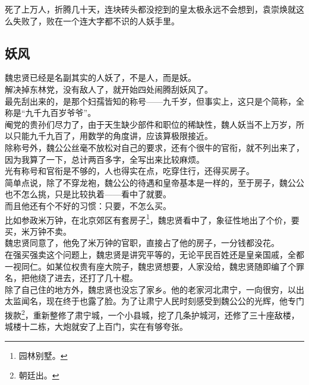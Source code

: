 \begin{multicols}{\theparacolNo}
死了上万人，折腾几十天，连块砖头都没挖到的皇太极永远不会想到，袁崇焕就这么失败了，败在一个连大字都不识的人妖手里。\\

\subsection{妖风}
魏忠贤已经是名副其实的人妖了，不是人，而是妖。\\

解决掉东林党，没有敌人了，就开始四处闹腾刮妖风了。\\

最先刮出来的，是那个妇孺皆知的称号——九千岁，但事实上，这只是个简称，全称是“九千九百岁爷爷”。\\

阉党的贵孙们尽力了，由于天生缺少部件和职位的稀缺性，魏人妖当不上万岁，所以只能九千九百了，用数学的角度讲，应该算极限接近。\\

除称号外，魏公公丝毫不放松对自己的要求，还有个很牛的官衔，就不列出来了，因为我算了一下，总计两百多字，全写出来比较麻烦。\\

光有称号和官衔是不够的，人也得实在点，吃穿住行，还得买房子。\\

简单点说，除了不穿龙袍，魏公公的待遇和皇帝基本是一样的，至于房子，魏公公也不怎么挑，只是比较执着——看中了就要。\\

而且他还有个不好的习惯：只要，不怎么买。\\

比如参政米万钟，在北京郊区有套房子\footnote{园林别墅。}，魏忠贤看中了，象征性地出了个价，要买，米万钟不卖。\\

魏忠贤同意了，他免了米万钟的官职，直接占了他的房子，一分钱都没花。\\

在强买强卖这个问题上，魏忠贤是讲究平等的，无论平民百姓还是皇亲国戚，全都一视同仁。如某位权贵有座大院子，魏忠贤想要，人家没给，魏忠贤随即编了个罪名，把他绕了进去，还打了几十棍。\\

除了自己住的地方外，魏忠贤也没忘了家乡。他的老家河北肃宁，一向很穷，以出太监闻名，现在终于也露了脸。为了让肃宁人民时刻感受到魏公公的光辉，他专门拨款\footnote{朝廷出。}，重新整修了肃宁城，一个小县城，挖了几条护城河，还修了三十座敌楼，城楼十二栋，大炮就安了上百门，实在有够夸张。\\


\end{multicols}
